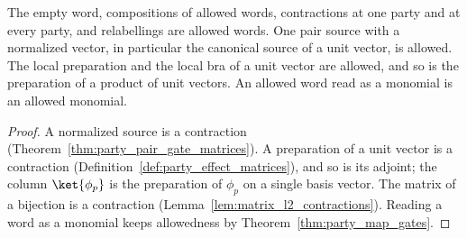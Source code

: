\begin{theorem}
    \label{thm:party_word_allowed}
    \leanok
    The empty word, compositions of allowed words, contractions at one party and at
    every party, and relabellings are allowed words. One pair source with a normalized
    vector, in particular the canonical source of a unit vector, is allowed. The local
    preparation and the local bra of a unit vector are allowed, and so is the
    preparation of a product of unit vectors. An allowed word read as a monomial is an
    allowed monomial.
\end{theorem}
\begin{proof}\leanok
    A normalized source is a contraction
    (Theorem~\ref{thm:party_pair_gate_matrices}). A preparation of a unit vector is a
    contraction (Definition~\ref{def:party_effect_matrices}), and so is its adjoint;
    the column $\ket{\phi_p}$ is the preparation of $\phi_p$ on a single basis vector.
    The matrix of a bijection is a contraction (Lemma~\ref{lem:matrix_l2_contractions}).
    Reading a word as a monomial keeps allowedness by Theorem~\ref{thm:party_map_gates}.
\end{proof}

